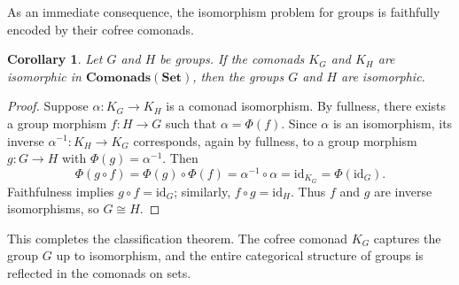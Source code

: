 \documentclass{amsart}
\newtheorem{corollary}{Corollary}
\begin{document}
As an immediate consequence, the isomorphism problem for groups is faithfully encoded by their cofree comonads.

\begin{corollary}\label{cor:reconstruction}
Let $G$ and $H$ be groups. If the comonads $K_G$ and $K_H$ are isomorphic in $\mathbf{Comonads}(\mathbf{Set})$, then the groups $G$ and $H$ are isomorphic.
\end{corollary}

\begin{proof}
Suppose $\alpha \colon K_G \rightarrow K_H$ is a comonad isomorphism. 
By fullness, there exists a group morphism $f \colon H \rightarrow G$ such that $\alpha = \Phi(f)$. 
Since $\alpha$ is an isomorphism, its inverse $\alpha^{-1} \colon K_H \rightarrow K_G$ corresponds, again by fullness, to a group morphism $g \colon G \rightarrow H$ with $\Phi(g) = \alpha^{-1}$. 
Then
\[
\Phi(g \circ f) = \Phi(g) \circ \Phi(f) = \alpha^{-1} \circ \alpha = \mathrm{id}_{K_G} = \Phi(\mathrm{id}_G).
\]
Faithfulness implies $g \circ f = \mathrm{id}_G$; similarly, $f \circ g = \mathrm{id}_H$. 
Thus $f$ and $g$ are inverse isomorphisms, so $G \cong H$.
\end{proof}

This completes the classification theorem. The cofree comonad $K_G$ captures the group $G$ up to isomorphism, and the entire categorical structure of groups is reflected in the comonads on sets.




\end{document}
